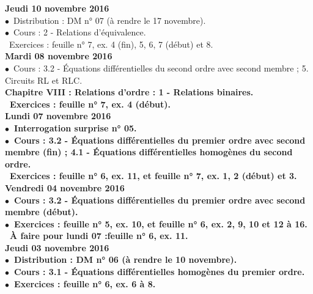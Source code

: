 \documentclass[12pt,a4paper]{article}
\begin{document}
\noindent\textbf{Jeudi 10 novembre 2016 }\\
$\bullet$\ Distribution : DM n° 07 (à rendre le 17 novembre).\\
$\bullet$\ Cours : 2 - Relations d'équivalence.\\
\bu\ Exercices : feuille n° 7, ex. 4 (fin), 5, 6, 7 (début) et 8.\vspace{.4cm}\\

\noindent\textbf{\bf Mardi 08 novembre 2016 }\\
$\bullet$\ Cours : 3.2 - Équations différentielles du second ordre avec second membre ; 5. Circuits RL et RLC.\\
\bf Chapitre VIII \rm : Relations d'ordre : 1 - Relations binaires.\\
\bu\ Exercices : feuille n° 7, ex. 4 (début).\vspace{.4cm}\\

\noindent\textbf{ Lundi 07 novembre 2016 } \\
$\bullet$\ Interrogation surprise n° 05.\\
$\bullet$\ Cours : 3.2 - Équations différentielles du premier ordre avec second membre (fin) ; 4.1 - Équations 
différentielles homogènes du second ordre.\\
\bu\ Exercices : feuille n° 6, ex. 11, et feuille n° 7, ex. 1, 2 (début) et 3.\vspace{.4cm}\\

\noindent\textbf{Vendredi 04 novembre 2016 }\\
$\bullet$\ Cours : 3.2 - Équations différentielles du premier ordre avec 
second membre (début).\\
$\bullet$\ Exercices : feuille n° 5, ex. 10, et feuille n° 6, ex. 2, 9, 10 et 12 à 16.\\
\bu\ À faire pour lundi 07 :feuille n° 6, ex. 11.\vspace{.4cm}\\

\noindent\textbf{Jeudi 03 novembre 2016 }\\
$\bullet$\ Distribution : DM n° 06 (à rendre le 10 novembre).\\
$\bullet$\ Cours : 3.1 - Équations différentielles homogènes du premier ordre.\\
$\bullet$\ Exercices : feuille n° 6, ex. 6 à 8.\vspace{.4cm}\\
\end{document}
